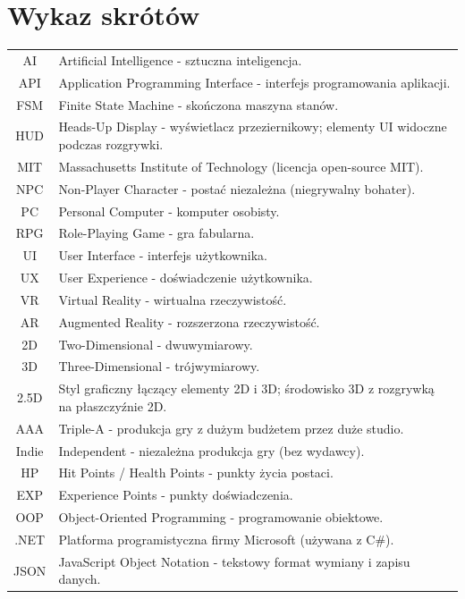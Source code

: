 \section*{Wykaz skrótów}

\begin{longtable}{cp{}}

AI    & Artificial Intelligence - sztuczna inteligencja. \\
API   & Application Programming Interface - interfejs programowania aplikacji. \\
FSM   & Finite State Machine - skończona maszyna stanów. \\
HUD   & Heads-Up Display - wyświetlacz przeziernikowy; elementy UI widoczne podczas rozgrywki. \\
MIT   & Massachusetts Institute of Technology (licencja open-source MIT). \\
NPC   & Non-Player Character - postać niezależna (niegrywalny bohater). \\
PC    & Personal Computer - komputer osobisty. \\
RPG   & Role-Playing Game - gra fabularna. \\
UI    & User Interface - interfejs użytkownika. \\
UX    & User Experience - doświadczenie użytkownika. \\
VR    & Virtual Reality - wirtualna rzeczywistość. \\
AR    & Augmented Reality - rozszerzona rzeczywistość. \\
2D    & Two-Dimensional - dwuwymiarowy. \\
3D    & Three-Dimensional - trójwymiarowy. \\
2.5D  & Styl graficzny łączący elementy 2D i 3D; środowisko 3D z rozgrywką na płaszczyźnie 2D. \\
AAA   & Triple-A - produkcja gry z dużym budżetem przez duże studio. \\
Indie & Independent - niezależna produkcja gry (bez wydawcy). \\
HP    & Hit Points / Health Points - punkty życia postaci. \\
EXP   & Experience Points - punkty doświadczenia. \\
OOP   & Object-Oriented Programming - programowanie obiektowe. \\
.NET  & Platforma programistyczna firmy Microsoft (używana z C\#). \\
JSON  & JavaScript Object Notation - tekstowy format wymiany i zapisu danych. \\

\end{longtable}
